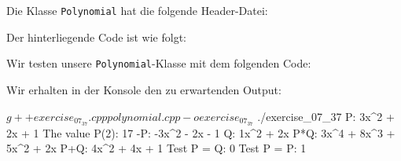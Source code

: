 \section{}

Die Klasse \texttt{Polynomial} hat die folgende Header-Datei:



Der hinterliegende Code ist wie folgt:



Wir testen unsere \texttt{Polynomial}-Klasse mit dem folgenden Code:



Wir erhalten in der Konsole den zu erwartenden Output:

\begin{consoleoutput}
$ g++ exercise_07_37.cpp polynomial.cpp -o exercise_07_37 
$ ./exercise_07_37 
P: 3x^2 + 2x + 1
The value P(2): 17
-P: -3x^2 - 2x - 1
Q: 1x^2 + 2x
P*Q: 3x^4 + 8x^3 + 5x^2 + 2x
P+Q: 4x^2 + 4x + 1
Test P = Q: 0
Test P = P: 1
\end{consoleoutput}

